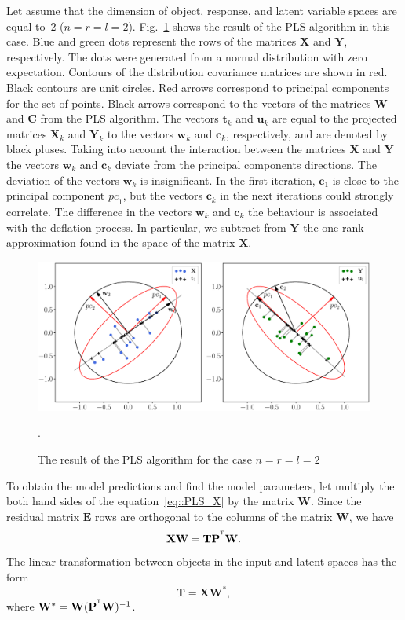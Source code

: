 \documentclass[12pt,twoside]{article}
\newcommand{\bw}{\mathbf{w}}
\newcommand{\bY}{\mathbf{Y}}
\newcommand{\bX}{\mathbf{X}}
\newcommand{\bu}{\mathbf{u}}
\newcommand{\bt}{\mathbf{t}}
\newcommand{\bc}{\mathbf{c}}
\newcommand{\bP}{\mathbf{P}}
\newcommand{\bT}{\mathbf{T}}
\newcommand{\bC}{\mathbf{C}}
\newcommand{\bE}{\mathbf{E}}
\newcommand{\bW}{\mathbf{W}}
\newcommand{\T}{^{\text{\tiny\sffamily\upshape\mdseries T}}}
\begin{document}
Let assume that the dimension of object, response, and latent variable spaces are equal to~2 ($n = r = l = 2$).
Fig.~\ref{fig::PLSFigure} shows the result of the PLS algorithm in this case.
Blue and green dots represent the rows of the matrices $\bX$ and $\bY$, respectively. 
The dots were generated from a normal distribution with zero expectation. 
Contours of the distribution covariance matrices are shown in red.
Black contours are unit circles. 
Red arrows correspond to principal components for the set of points. 
Black arrows correspond to the vectors of the matrices $\bW$ and $\bC$ from the PLS algorithm. 
The vectors $\bt_k$ and $\bu_k$ are equal to the projected matrices $\bX_k$ and $\bY_k$ to the vectors $\bw_k$ and $\bc_k$, respectively, and are denoted by black pluses. 
Taking into account the interaction between the matrices $\bX$ and $\bY$ the vectors $\bw_k$ and $\bc_k$ deviate from the principal components directions. 
The deviation of the vectors $\bw_k$ is insignificant. 
In the first iteration, $\bc_1$ is close to the principal component $\textit{pc}_1$, but the vectors $\bc_k$ in the next iterations could strongly correlate. 
The difference in the vectors $\bw_k$ and $\bc_k$ the behaviour is associated with the deflation process. In particular, we subtract from $\bY$ the one-rank approximation found in the space of the matrix $\bX$.
\begin{figure}[h]
	\centering
	\includegraphics[width=\linewidth]{figs/PLSFigure.eps}
	\caption{The result of the PLS algorithm for the case $n = r = l = 2$}.
	\label{fig::PLSFigure}
\end{figure}

To obtain the model predictions and find the model parameters, let multiply the both hand sides of the equation~\eqref{eq::PLS_X} by the matrix $\bW$. 
Since the residual matrix  $\bE$ rows are orthogonal to the columns of the matrix $\bW$, we have
\[
	\bX \bW = \bT \bP^{\T} \bW.
\]
The linear transformation between objects in the input and latent spaces has the form
\begin{equation}
	\bT = \bX \bW^*,
	\label{eq::W*}
\end{equation}
where $\bW^* = \bW (\bP^{\T} \bW)^{-1}$.
\end{document}
